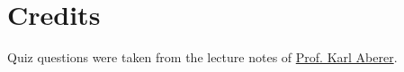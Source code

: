 \documentclass[12pt,a4paper]{exam} %
\begin{document}
\section*{Credits}
Quiz questions were taken from the lecture notes of \href{http://people.epfl.ch/karl.aberer}{Prof. Karl Aberer}.%

%
\end{document}
